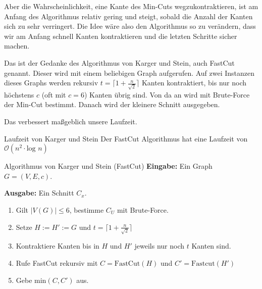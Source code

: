 \documentclass{panikzettel}
\begin{document}
Aber die Wahrscheinlichkeit, eine Kante des Min-Cuts wegzukontraktieren, ist am Anfang des Algorithmus
relativ gering und steigt, sobald die Anzahl der Kanten sich zu sehr verringert. Die Idee wäre also den Algorithmus so zu verändern, dass wir am Anfang schnell Kanten kontraktieren und die letzten Schritte sicher machen.


\begin{halfboxl}
Das ist der Gedanke des Algorithmus von Karger und Stein, auch FastCut genannt. Dieser wird mit einem beliebigen Graph aufgerufen. Auf zwei Instanzen dieses Graphs werden rekursiv $t = \lceil 1 + \frac{n}{\sqrt{2}}\rceil$ Kanten kontraktiert, bis nur noch höchstens $c$ (oft mit $c = 6$) Kanten übrig sind. Von da an wird mit Brute-Force der Min-Cut bestimmt. Danach wird der kleinere Schnitt ausgegeben.

Das verbessert maßgeblich unsere Laufzeit.

\begin{theo}{Laufzeit von Karger und Stein}
Der FastCut Algorithmus hat eine Laufzeit von $\mathcal{O}(n^2\cdot \text{log }n)$
\end{theo}
\end{halfboxl}%
\begin{halfboxr}
\vspace{-\baselineskip}
\begin{algo}{Algorithmus von Karger und Stein (FastCut)}
\textbf{Eingabe:} Ein Graph $G=(V,E,c)$.

\textbf{Ausgabe:} Ein Schnitt $C_x$.
\tcblower
\begin{enumerate}

    \item Gilt $|V(G)| \le 6$, bestimme $C_U$ mit Brute-Force.
    \item Setze $H := H' := G$ und $t = \lceil 1+ \frac{n}{\sqrt{2}} \rceil$
    \item Kontraktiere Kanten bis in $H$ und $H'$ jeweils nur noch $t$ Kanten sind.
    \item Rufe FastCut rekursiv mit $C = \text{FastCut}(H)$ und $C'= \text{Fastcut}(H')$
    \item Gebe $\text{min}(C,C')$ aus.
\end{enumerate}
\end{algo}
\end{halfboxr}
\end{document}
